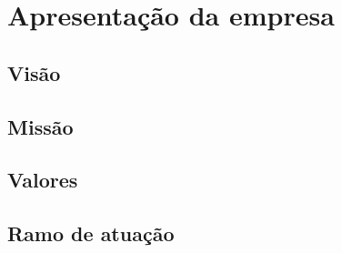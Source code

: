 \chapter{Apresentação da empresa}\label{ch:apresentacao}

\section{Visão}\label{sec:visao}

\section{Missão}\label{sec:missao}

\section{Valores}\label{sec:valores}

\section{Ramo de atuação}\label{sec:ramo}
